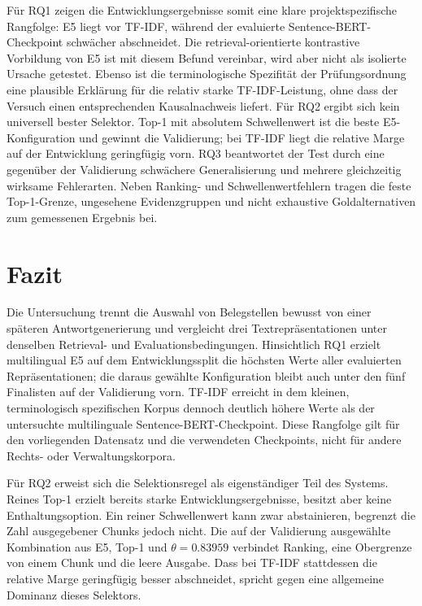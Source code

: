 \documentclass[11pt]{article}
\begin{document}
Für RQ1 zeigen die Entwicklungsergebnisse somit eine klare projektspezifische Rangfolge: E5 liegt vor TF-IDF, während der evaluierte Sentence-BERT-Checkpoint schwächer abschneidet. Die retrieval-orientierte kontrastive Vorbildung von E5 ist mit diesem Befund vereinbar, wird aber nicht als isolierte Ursache getestet. Ebenso ist die terminologische Spezifität der Prüfungsordnung eine plausible Erklärung für die relativ starke TF-IDF-Leistung, ohne dass der Versuch einen entsprechenden Kausalnachweis liefert. Für RQ2 ergibt sich kein universell bester Selektor. Top-1 mit absolutem Schwellenwert ist die beste E5-Konfiguration und gewinnt die Validierung; bei TF-IDF liegt die relative Marge auf der Entwicklung geringfügig vorn. RQ3 beantwortet der Test durch eine gegenüber der Validierung schwächere Generalisierung und mehrere gleichzeitig wirksame Fehlerarten. Neben Ranking- und Schwellenwertfehlern tragen die feste Top-1-Grenze, ungesehene Evidenzgruppen und nicht exhaustive Goldalternativen zum gemessenen Ergebnis bei.


\section{Fazit}

Die Untersuchung trennt die Auswahl von Belegstellen bewusst von einer späteren Antwortgenerierung und vergleicht drei Textrepräsentationen unter denselben Retrieval- und Evaluationsbedingungen. Hinsichtlich RQ1 erzielt multilingual E5 auf dem Entwicklungssplit die höchsten Werte aller evaluierten Repräsentationen; die daraus gewählte Konfiguration bleibt auch unter den fünf Finalisten auf der Validierung vorn. TF-IDF erreicht in dem kleinen, terminologisch spezifischen Korpus dennoch deutlich höhere Werte als der untersuchte multilinguale Sentence-BERT-Checkpoint. Diese Rangfolge gilt für den vorliegenden Datensatz und die verwendeten Checkpoints, nicht für andere Rechts- oder Verwaltungskorpora.

Für RQ2 erweist sich die Selektionsregel als eigenständiger Teil des Systems. Reines Top-1 erzielt bereits starke Entwicklungsergebnisse, besitzt aber keine Enthaltungsoption. Ein reiner Schwellenwert kann zwar abstainieren, begrenzt die Zahl ausgegebener Chunks jedoch nicht. Die auf der Validierung ausgewählte Kombination aus E5, Top-1 und $\theta=0.83959$ verbindet Ranking, eine Obergrenze von einem Chunk und die leere Ausgabe. Dass bei TF-IDF stattdessen die relative Marge geringfügig besser abschneidet, spricht gegen eine allgemeine Dominanz dieses Selektors.
\end{document}
